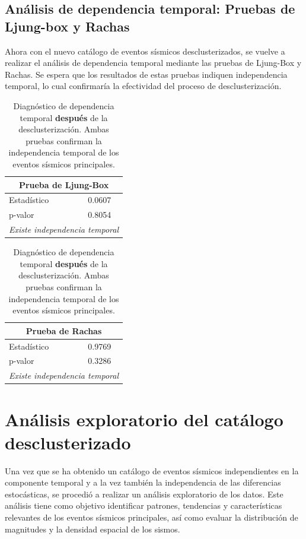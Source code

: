 \subsection{Análisis de dependencia temporal: Pruebas de Ljung-box y Rachas}
Ahora con el nuevo catálogo de eventos sísmicos desclusterizados, se vuelve a realizar el análisis de dependencia temporal mediante las pruebas de Ljung-Box y Rachas. 
Se espera que los resultados de estas pruebas indiquen independencia temporal, lo cual confirmaría la efectividad del proceso de desclusterización.
\begin{table}[H]
    \centering
    \begin{minipage}[t]{0.47\textwidth}
        \centering
        \begin{tabular}{lc}
            \hline
            \multicolumn{2}{c}{\textbf{Prueba de Ljung-Box}} \\
            \hline
            Estadístico & 0.0607 \\
            p-valor     & 0.8054 \\
            \hline
            \multicolumn{2}{c}{\textit{Existe independencia temporal}} \\
            \hline
        \end{tabular}
    \end{minipage}
    \hfill
    \begin{minipage}[t]{0.47\textwidth}
        \centering
        \begin{tabular}{lc}
            \hline
            \multicolumn{2}{c}{\textbf{Prueba de Rachas}} \\
            \hline
            Estadístico & 0.9769 \\
            p-valor     & 0.3286  \\
            \hline
            \multicolumn{2}{c}{\textit{Existe independencia temporal}} \\
            \hline
        \end{tabular}
    \end{minipage}
    
    \caption{Diagnóstico de dependencia temporal \textbf{después} de la desclusterización. Ambas pruebas confirman la independencia temporal de los eventos sísmicos principales.}
    \label{tab:pruebas-temporales-post}
\end{table}


\section{Análisis exploratorio del catálogo desclusterizado}   
Una vez que se ha obtenido un catálogo de eventos sísmicos independientes en la componente temporal y a la vez también la independencia de las diferencias estocásticas, se procedió a realizar un análisis exploratorio de los datos. 
Este análisis tiene como objetivo identificar patrones, tendencias y características relevantes de los eventos sísmicos principales, así como evaluar la distribución de magnitudes y la densidad espacial de los sismos.
